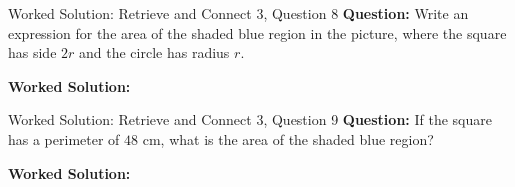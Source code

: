 \documentclass{beamer}
\newcommand{\ashow}[1]{\uncover<2->{\textcolor{red}{\small #1}}}
\begin{document}
\begin{frame}{Worked Solution: Retrieve and Connect 3, Question 8}
\textbf{Question:} Write an expression for the area of the shaded blue region in the picture, where the square has side \(2r\) and the circle has radius \(r\).

\textbf{Worked Solution:} \ashow{Square area \(= (2r)^2 = 4r^2\). Shaded area \(= 4r^2 - \pi r^2\).}
\end{frame}

\begin{frame}{Worked Solution: Retrieve and Connect 3, Question 9}
\textbf{Question:} If the square has a perimeter of \(48\) cm, what is the area of the shaded blue region?

\textbf{Worked Solution:} \ashow{Side \(= 48 \div 4 = 12\) cm, so \(2r = 12\) and \(r = 6\) cm. Square area \(= 12^2 = 144\) cm\(^2\). Circle area \(= \pi \times 6^2 = 3.14 \times 36 = 113.04\) cm\(^2\). Shaded area \(= 144 - 113.04 = 30.96\) cm\(^2\).}
\end{frame}
\end{document}
